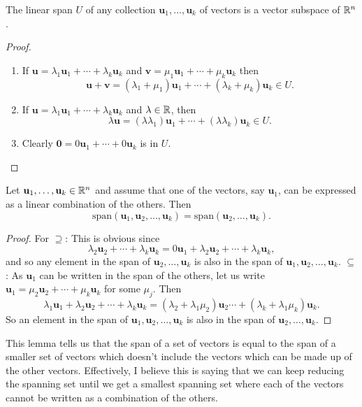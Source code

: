 \documentclass[10pt, a4paper]{article}
\newcommand{\mbf}[1]{\mathbf{#1}}
\begin{document}
\begin{lemma}
    The linear span $U$ of any collection $\mbf{u}_1, \dotsc, \mbf{u}_k$ of vectors is a vector subspace of $\mathbb{R} ^ n$.
    \begin{proof}
        \begin{enumerate}[label = (\roman*)]
            \item If $\mbf{u} = \lambda_1\mbf{u}_1 + \dotsi + \lambda_k\mbf{u}_k$ and $\mbf{v} = \mu_1\mbf{u}_1 + \dotsi + \mu_k\mbf{u}_k$ then
            \[
            \mbf{u} + \mbf{v} = (\lambda_1 + \mu_1)\mbf{u}_1 + \dotsi + (\lambda_k + \mu_k)\mbf{u}_k \in U.
            \]
            \item If $\mbf{u} = \lambda_1\mbf{u}_1 + \dotsi + \lambda_k\mbf{u}_k$ and $\lambda \in \mathbb{R}$,
            then
            \[
            \lambda\mbf{u} = (\lambda\lambda_1)\mbf{u}_1 + \dotsi + (\lambda\lambda_k)\mbf{u}_k \in U.
            \]
            \item Clearly $\mbf{0} = 0\mbf{u}_1 + \dotsi + 0\mbf{u}_k$ is in $U$.
        \end{enumerate}
    \end{proof}
\end{lemma}

\begin{lemma}
    Let $\mbf{u}_1, \dotsc, \mbf{u}_k \in \R ^ n$ and assume that one of the vectors,
    say $\mbf{u}_1$,
    can be expressed as a linear combination of the others.
    Then
    \[
    \mathrm{span}(\mbf{u}_1, \mbf{u}_2, \dotsc, \mbf{u}_k) = \mathrm{span}(\mbf{u}_2, \dotsc, \mbf{u}_k).
    \]
    \begin{proof}
        For $\supseteq$:
        This is obvious since
        \[
        \lambda_2\mbf{u}_2 + \dotsi + \lambda_k\mbf{u}_k = 0\mbf{u}_1 + \lambda_2\mbf{u}_2 + \dotsi + \lambda_k\mbf{u}_k,
        \]
        and so any element in the span of $\mbf{u}_2, \dotsc, \mbf{u}_k$ is also in the span of $\mbf{u}_1, \mbf{u}_2, \dotsc, \mbf{u}_k$.
        $\subseteq$:
        As $\mbf{u}_1$ can be written in the span of the others,
        let us write $\mbf{u}_1 = \mu_2\mbf{u}_2 + \dotsi + \mu_k\mbf{u}_k$ for some $\mu_j$.
        Then
        \[
        \lambda_1\mbf{u}_1 + \lambda_2\mbf{u}_2 + \dotsi + \lambda_k\mbf{u}_k = (\lambda_2 + \lambda_1\mu_2)\mbf{u}_2 \dotsi + (\lambda_k + \lambda_1\mu_k)\mbf{u}_k.
        \]
        So an element in the span of $\mbf{u}_1, \mbf{u}_2, \dotsc, \mbf{u}_k$ is also in the span of $\mbf{u}_2, \dotsc, \mbf{u}_k$.
    \end{proof}
\end{lemma}
This lemma tells us that the span of a set of vectors is equal to the span of a smaller set of vectors which doesn't include the vectors which can be made up of the other vectors.
Effectively,
I believe this is saying that we can keep reducing the spanning set until we get a smallest spanning set where each of the vectors cannot be written as a combination of the others.
\end{document}
